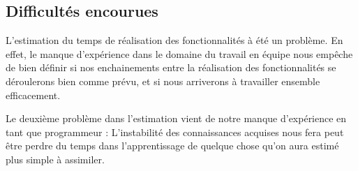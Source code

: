 \subsection{Difficultés encourues} 
L'estimation du temps de réalisation des fonctionnalités à été un problème. 
En effet, le manque d'expérience dans le domaine du travail en équipe nous empêche de bien définir si nos enchainements entre la réalisation des fonctionnalités se déroulerons bien comme prévu, et si nous arriverons à travailler ensemble efficacement. 

Le deuxième problème dans l'estimation vient de notre manque d'expérience en tant que programmeur :
L'instabilité des connaissances acquises nous fera peut être perdre du temps dans l'apprentissage de quelque chose qu'on aura estimé plus simple à assimiler. 
